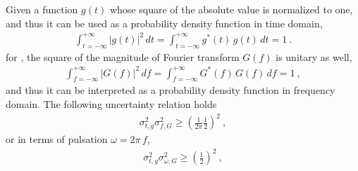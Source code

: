 \documentclass[letterpaper,10pt,english]{jupyterBook}
\begin{document}
\sphinxAtStartPar
Given a function \(g(t)\) whose square of the absolute value is normalized to one, and thus it can be used as a probability density function in time domain,
\begin{equation*}
\begin{split}\int_{t = -\infty}^{+\infty} |g(t)|^2 \, dt =  \int_{t = -\infty}^{+\infty} g^*(t) \, g(t) \, dt = 1 \ .\end{split}
\end{equation*}
\sphinxAtStartPar
for {\hyperref[\detokenize{ch/complex/fourier-transform:complex-fourier-transform-plancherel}]{}}, the square of the magnitude of Fourier transform \(G(f)\) is unitary as well,
\begin{equation*}
\begin{split}\int_{f = -\infty}^{+\infty} |G(f)|^2 \, df =  \int_{f = -\infty}^{+\infty} G^*(f) \, G(f) \, df = 1 \ ,\end{split}
\end{equation*}
\sphinxAtStartPar
and thus it can be interpreted as a probability density function in frequency domain. The following uncertainty relation holds
\begin{equation*}
\begin{split}\sigma_{t,g}^2 \sigma_{f,G}^2 \ge \left( \frac{1}{2 \pi} \frac{1}{2} \right)^2 \ , \end{split}
\end{equation*}
\sphinxAtStartPar
or in terms of pulsation \(\omega = 2 \pi \, f\),
\begin{equation*}
\begin{split}\sigma_{t,g}^2 \sigma_{\omega,G}^2 \ge \left( \frac{1}{2} \right)^2 \ , \end{split}
\end{equation*}
\end{document}
